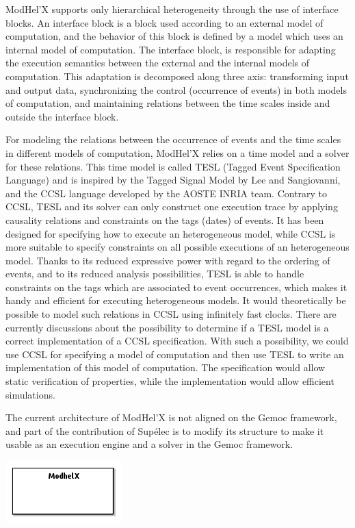 \documentclass{gemoc} %
\begin{document}
ModHel'X supports only hierarchical heterogeneity through the use of interface blocks. An interface block is a block used according to an external model of computation, and the behavior of this block is defined by a model which uses an internal model of computation. The interface block, is responsible for adapting the execution semantics between the external and the internal models of computation. This adaptation is decomposed along three axis: transforming input and output data, synchronizing the control (occurrence of events) in both models of computation, and maintaining relations between the time scales inside and outside the interface block.

For modeling the relations between the occurrence of events and the time scales in different models of computation, ModHel'X relies on a time model and a solver for these relations. This time model is called TESL (Tagged Event Specification Language) and is inspired by the Tagged Signal Model by Lee and Sangiovanni, and the CCSL language developed by the AOSTE INRIA team. Contrary to CCSL, TESL and its solver can only construct one execution trace by applying causality relations and constraints on the tags (dates) of events. It has been designed for specifying how to execute an heterogeneous model, while CCSL is more suitable to specify constraints on all possible executions of an heterogeneous model. Thanks to its reduced expressive power with regard to the ordering of events, and to its reduced analysis possibilities, TESL is able to handle constraints on the tags which are associated to event occurrences, which makes it handy and efficient for executing heterogeneous models. It would theoretically be possible to model such relations in CCSL using infinitely fast clocks. There are currently discussions about the possibility to determine if a TESL model is a correct implementation of a CCSL specification. With such a possibility, we could use CCSL for specifying a model of computation and then use TESL to write an implementation of this model of computation. The specification would allow static verification of properties, while the implementation would allow efficient simulations.

The current architecture of ModHel'X is not aligned on the Gemoc framework, and part of the contribution of Sup\'elec is to modify its structure to make it usable as an execution engine and a solver in the Gemoc framework.


\begin{center}
\includegraphics*[trim=0.0cm 0.0cm 0cm 0.0cm, clip=true]{../images/generated/Generated_Modhel_X.png}
\end{center}
\end{document}
